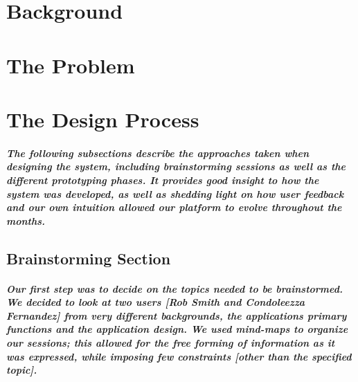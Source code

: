 \documentclass{report}
\begin{document}
\chapter{Background}

\chapter{The Problem}

\chapter{The Design Process}
    \paragraph{The following subsections describe the approaches taken when
    designing the system, including brainstorming sessions as well as the different
    prototyping phases. It provides good insight to how the system was developed, as
    well as shedding light on how user feedback and our own intuition allowed our
    platform to evolve throughout the months.}
\section{Brainstorming Section}
    \paragraph{Our first step was to decide on the topics needed to be brainstormed.
    We decided to look at two users [Rob Smith and Condoleezza Fernandez] from very
    different backgrounds, the applications primary functions and the application
    design. We used mind-maps to organize our sessions; this allowed for the free
    forming of information as it was expressed, while imposing few constraints
    [other than the specified topic].}
\end{document}
